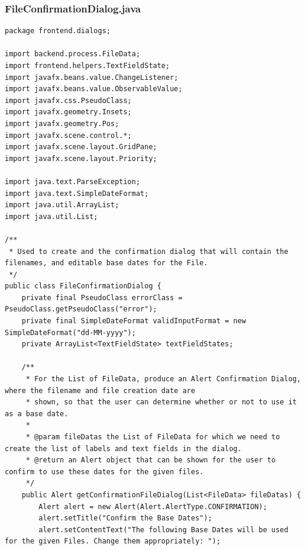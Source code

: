 \subsubsection{FileConfirmationDialog.java}
\begin{lstlisting}
package frontend.dialogs;

import backend.process.FileData;
import frontend.helpers.TextFieldState;
import javafx.beans.value.ChangeListener;
import javafx.beans.value.ObservableValue;
import javafx.css.PseudoClass;
import javafx.geometry.Insets;
import javafx.geometry.Pos;
import javafx.scene.control.*;
import javafx.scene.layout.GridPane;
import javafx.scene.layout.Priority;

import java.text.ParseException;
import java.text.SimpleDateFormat;
import java.util.ArrayList;
import java.util.List;

/**
 * Used to create and the confirmation dialog that will contain the filenames, and editable base dates for the File.
 */
public class FileConfirmationDialog {
    private final PseudoClass errorClass = PseudoClass.getPseudoClass("error");
    private final SimpleDateFormat validInputFormat = new SimpleDateFormat("dd-MM-yyyy");
    private ArrayList<TextFieldState> textFieldStates;

    /**
     * For the List of FileData, produce an Alert Confirmation Dialog, where the filename and file creation date are
     * shown, so that the user can determine whether or not to use it as a base date.
     *
     * @param fileDatas the List of FileData for which we need to create the list of labels and text fields in the dialog.
     * @return an Alert object that can be shown for the user to confirm to use these dates for the given files.
     */
    public Alert getConfirmationFileDialog(List<FileData> fileDatas) {
        Alert alert = new Alert(Alert.AlertType.CONFIRMATION);
        alert.setTitle("Confirm the Base Dates");
        alert.setContentText("The following Base Dates will be used for the given Files. Change them appropriately: ");


\end{lstlisting}
